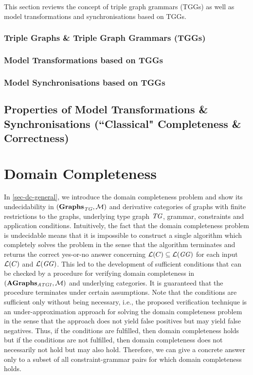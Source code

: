 \documentclass{eceasst}
\begin{document}
This section reviews the concept of triple graph grammars (TGGs) as well as model transformations and synchronisations based on TGGs.

\subsection{Triple Graphs \& Triple Graph Grammars (TGGs)}
\label{sec-tgg}


\subsection{Model Transformations based on TGGs}
\label{sec-mt-tgg}


\subsection{Model Synchronisations based on TGGs}
\label{sec-msynch-tgg}


\section[Properties of Model Transformations \& Synchronisations]{Properties of Model Transformations \& Synchronisations (``Classical" Completeness \& Correctness)}
\label{sec-gen-intro-compl}


\chapter{Domain Completeness}
\label{sec-dom-compl}

In \cref{sec-dc-general}, we introduce the domain completeness problem and show its undecidability in $(\mathbf{\mathbf{Graphs}_\mathit{TG}},{\cal M})$ and derivative categories of graphs with finite restrictions to the graphs, underlying type graph $\mathit{TG}$, grammar, constraints and application conditions.
Intuitively, the fact that the domain completeness problem is undecidable means that it is impossible to construct a single algorithm which completely solves the problem in the sense that the algorithm terminates and returns the correct yes-or-no answer concerning $\mathcal{L}(C) \subseteq \mathcal{L}(\mathit{GG})$ for each input $\mathcal{L}(C)$ and $\mathcal{L}(\mathit{GG})$.
This led to the development of sufficient conditions that can be checked by a procedure for verifying domain completeness in $(\mathbf{AGraphs_\mathit{ATGI}},{\cal M})$ and underlying categories.
It is guaranteed that the procedure terminates under certain assumptions.
Note that the conditions are sufficient only without being necessary, i.e., the proposed verification technique is an under-approximation approach for solving the domain completeness problem in the sense that the approach does not yield false positives but may yield false negatives.
Thus, if the conditions are fulfilled, then domain completeness holds but if the conditions are not fulfilled, then domain completeness does not necessarily not hold but may also hold.
Therefore, we can give a concrete answer only to a subset of all constraint-grammar pairs for which domain completeness holds.
\end{document}
